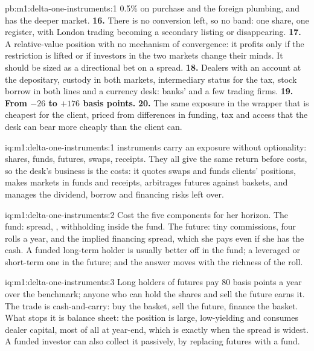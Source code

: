 \begin{solution}{pb:m1:delta-one-instruments:1}
0.5\% on purchase and the foreign plumbing, and has the deeper market.
\textbf{16.} There is no conversion left, so no band: one share, one
register, with London trading becoming a secondary listing or disappearing.
\textbf{17.} A relative-value position with no mechanism of convergence: it
profits only if the restriction is lifted or if investors in the two markets
change their minds. It should be sized as a directional bet on a spread.
\textbf{18.} Dealers with an account at the depositary, custody in both
markets, intermediary status for the tax, stock borrow in both lines and a
currency desk: banks'  and a few trading firms.
\textbf{19.} \textbf{From $-26$ to $+176$ basis points.}
\textbf{20.} The same exposure in the wrapper that is cheapest for the
client, priced from differences in funding, tax and access that the desk can
bear more cheaply than the client can.
\end{solution}

\begin{solution}{iq:m1:delta-one-instruments:1}
 instruments carry an exposure without optionality: shares, funds,
futures, swaps, receipts. They all give the same return before costs, so
the desk's business is the costs: it quotes swaps and funds clients'
positions, makes markets in funds and receipts, arbitrages futures against
baskets, and manages the dividend, borrow and financing risks left over.
\end{solution}

\begin{solution}{iq:m1:delta-one-instruments:2}
Cost the five components for her horizon. The fund: spread, ,
withholding inside the fund. The future: tiny commissions, four rolls a
year, and the implied financing spread, which she pays even if she has the
cash. A funded long-term holder is usually better off in the fund; a
leveraged or short-term one in the future; and the answer moves with the
richness of the roll.
\end{solution}

\begin{solution}{iq:m1:delta-one-instruments:3}
Long holders of futures pay 80 basis points a year over the benchmark;
anyone who can hold the shares and sell the future earns it. The trade is
cash-and-carry: buy the basket, sell the future, finance the basket. What
stops it is balance sheet: the position is large, low-yielding and consumes
dealer capital, most of all at year-end, which is exactly when the spread is
widest. A funded investor can also collect it passively, by replacing
futures with a fund.
\end{solution}

